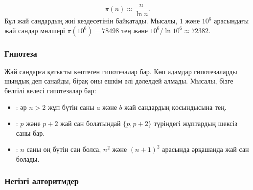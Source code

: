 \[\pi(n) \approx \frac{n}{\ln n}.\]
Бұл жай сандардың жиі кездесетінін байқатады.
Мысалы, $1$ және $10^6$ арасындағы 
жай сандар мөлшері $\pi(10^6)=78498$ тең және 
$10^6 / \ln 10^6 \approx 72382$.

\subsubsection{Гипотеза}

Жай сандарға қатысты көптеген гипотезалар бар.
Көп адамдар гипотезаларды шындық деп санайды, 
бірақ оны ешкім әлі дәлелдей алмады. Мысалы, бізге белгілі келесі
гипотезалар бар:

\begin{itemize}
\item {}:
әр $n>2$ жұп бүтін саны
$a$ және $b$ жай сандардың қосындысына тең.
\item {}:
$p$ және $p+2$ жай сан болатындай
$\{p,p+2\}$ түріндегі жұптардың шексіз саны бар.
\item {}:
$n$ саны оң бүтін сан болса,
$n^2$ және $(n+1)^2$ арасында әрқашанда жай сан болады.
\end{itemize}


\subsubsection{Негізгі алгоритмдер}


